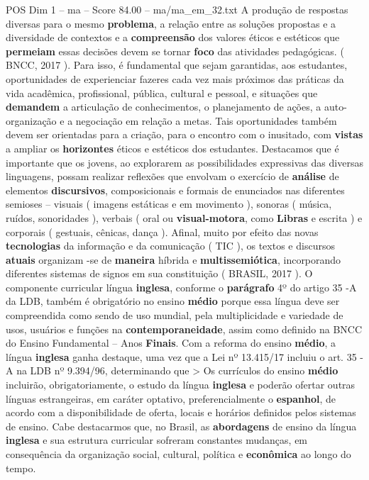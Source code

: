 \begin{textsample}{POS Dim 1 – ma – Score 84.00 – ma/ma\_em\_32.txt}
A produção de respostas diversas para o mesmo \textbf{problema}, a relação entre as soluções propostas e a diversidade de contextos e a \textbf{compreensão} dos valores éticos e estéticos que \textbf{permeiam} essas decisões devem se tornar \textbf{foco} das atividades pedagógicas. ( BNCC, 2017 ).
Para isso, é fundamental que sejam garantidas, aos estudantes, oportunidades de experienciar fazeres cada vez mais próximos das práticas da vida acadêmica, profissional, pública, cultural e pessoal, e situações que \textbf{demandem} a articulação de conhecimentos, o planejamento de ações, a auto-organização e a negociação em relação a metas.
Tais oportunidades também devem ser orientadas para a criação, para o encontro com o inusitado, com \textbf{vistas} a ampliar os \textbf{horizontes} éticos e estéticos dos estudantes.
Destacamos que é importante que os jovens, ao explorarem as possibilidades expressivas das diversas linguagens, possam realizar reflexões que envolvam o exercício de \textbf{análise} de elementos \textbf{discursivos}, composicionais e formais de enunciados nas diferentes semioses – visuais ( imagens estáticas e em movimento ), sonoras ( música, ruídos, sonoridades ), verbais ( oral ou \textbf{visual-motora}, como \textbf{Libras} e escrita ) e corporais ( gestuais, cênicas, dança ).
Afinal, muito por efeito das novas \textbf{tecnologias} da informação e da comunicação ( TIC ), os textos e discursos \textbf{atuais} organizam -se de \textbf{maneira} híbrida e \textbf{multissemiótica}, incorporando diferentes sistemas de signos em sua constituição ( BRASIL, 2017 ).
O componente curricular língua \textbf{inglesa}, conforme o \textbf{parágrafo} 4º do artigo 35 -A da LDB, também é obrigatório no ensino \textbf{médio} porque essa língua deve ser compreendida como sendo de uso mundial, pela multiplicidade e variedade de usos, usuários e funções na \textbf{contemporaneidade}, assim como definido na BNCC do Ensino Fundamental – Anos \textbf{Finais}.
Com a reforma do ensino \textbf{médio}, a língua \textbf{inglesa} ganha destaque, uma vez que a Lei nº 13.415/17 incluiu o art. 35 -A na LDB nº 9.394/96, determinando que > Os currículos do ensino \textbf{médio} incluirão, obrigatoriamente, o estudo da língua \textbf{inglesa} e poderão ofertar outras línguas estrangeiras, em caráter optativo, preferencialmente o \textbf{espanhol}, de acordo com a disponibilidade de oferta, locais e horários definidos pelos sistemas de ensino.
Cabe destacarmos que, no Brasil, as \textbf{abordagens} de ensino da língua \textbf{inglesa} e sua estrutura curricular sofreram constantes mudanças, em consequência da organização social, cultural, política e \textbf{econômica} ao longo do tempo.

\end{textsample}
